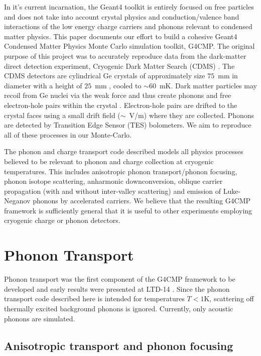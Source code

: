 \documentclass[preprint,12pt]{elsarticle}
\begin{document}
In it's current incarnation, the Geant4 toolkit is entirely focused on free particles and does not take into account crystal physics and conduction/valence band interactions of the low energy charge carriers and phonons relevant to condensed matter physics. This paper documents our effort to build a cohesive Geant4 Condensed Matter Physics Monte Carlo simulation toolkit, G4CMP. The original purpose of this project was to accurately reproduce data from the dark-matter direct detection experiment, Cryogenic Dark Matter Search (CDMS) \cite{CDMS-A}\cite{CDMS-B}\cite{CDMS-C}. The CDMS detectors are cylindrical Ge crystals of approximately size $75$~mm in diameter with a height of $25$~mm \cite{CDMS-E}, cooled to $\sim60$~mK. Dark matter particles may recoil from Ge nuclei via the weak force and thus create phonons and free electron-hole pairs within the crystal \cite{Lindhart}. Electron-hole pairs are drifted to the crystal faces using a small drift field ($\sim$~V/m) where they are collected. Phonons are detected by Transition Edge Sensor (TES) bolometers. We aim to reproduce all of these processes in our Monte-Carlo. 

The phonon and charge transport code described models all physics processes believed to be relevant to phonon and charge collection at cryogenic temperatures. This includes anisotropic phonon transport/phonon focusing, phonon isotope scattering, anharmonic downconversion, oblique carrier propagation (with and without inter-valley scattering) and emission of Luke-Neganov phonons by accelerated carriers. We believe that the resulting G4CMP framework is sufficiently general that it is useful to other experiments employing cryogenic charge or phonon detectors. 

\section{Phonon Transport}
\label{sec:PhononTransport}

Phonon transport was the first component of the G4CMP framework to be developed and early results were presented at LTD-14 \cite{Brandt}. Since the phonon transport code described here is intended for temperatures $T<1$K, scattering off thermally excited background phonons is ignored. Currently, only acoustic phonons are simulated.

\subsection{Anisotropic transport and phonon focusing}
\label{sec:Focusing}
\end{document}
